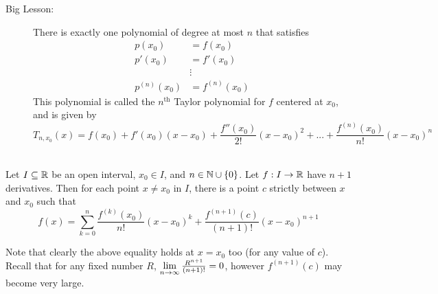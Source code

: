 \begin{description}
    \item[Big Lesson: ] There is exactly one polynomial of degree at most $n$ that satisfies
    \begin{align*}
        p(x_0) &= f(x_0) \\
        p'(x_0) &= f'(x_0) \\
        &\vdots \\
        p^{(n)}(x_0) &= f^{(n)}(x_0)
    \end{align*}
    This polynomial is called the $n^{\text{th}}$ Taylor polynomial for $f$ centered at $x_0$, and is given by
    $$
    T_{n, x_0}(x) = f(x_0) + f'(x_0)(x-x_0) + \frac{f''(x_0)}{2!}(x-x_0)^2 +...+ \frac{f^{(n)}(x_0)}{n!}(x-x_0)^n
    $$
\end{description}

\begin{theorem} \leavevmode\\
    \label{Taylor's Thm}
    Let $I \subseteq \mathbb{R}$ be an open interval, $x_0\in I$, and $n \in \mathbb{N}\cup \{0\}$. Let $f: I \to \mathbb{R}$ have $n+1$ derivatives. Then  for each point $x \not = x_0$ in $I$, there is a point $c$ strictly between $x$ and $x_0$ such that
    $$
    f(x) = \sum_{k=0}^{n}\frac{f^{(k)}(x_0)}{n!}(x-x_0)^k + \frac{f^{(n+1)}(c)}{(n+1)!}(x-x_0)^{n+1}
    $$
    \begin{remark}
        Note that clearly the above equality holds at $x=x_0$ too (for any value of $c$). Recall that for any fixed number $R$, $\lim \limits_{n \to \infty}\frac{R^{n+1}}{(n+1)!} = 0$, however $f^{(n+1)}(c)$ may become very large.
    \end{remark}
\end{theorem}

